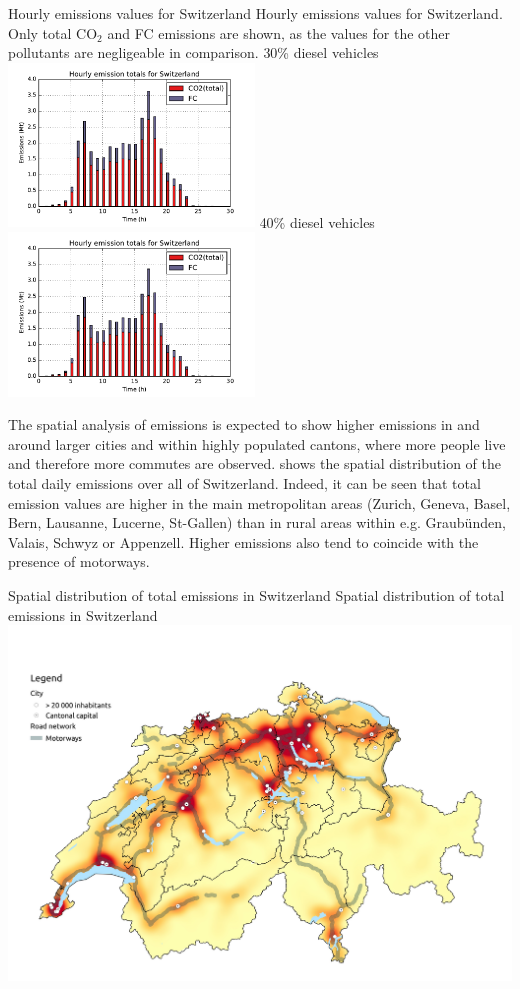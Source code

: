\createfigure%
{Hourly emissions values for Switzerland}%
{Hourly emissions values for Switzerland. Only total CO$_2$ and FC emissions are shown, as the values for the other pollutants are negligeable in comparison.}%
{\label{fig:hourlyEmissions}}%
{%
  \createsubfigure%
  {30\% diesel vehicles}%
  {\includegraphics[width=0.49\textwidth,
angle=0]{figures/hourly_emissions_30pct_diesel.pdf}}%
  {\label{fig:hourlyEmissions-30pctDiesel}}%
  {}%
  \createsubfigure%
  {40\% diesel vehicles}%
  {\includegraphics[width=0.49\textwidth,
angle=0]{figures/hourly_emissions_40pct_diesel.pdf}}%
  {}%
}%
{}

The spatial analysis of emissions is expected to show higher emissions in and around larger cities and within highly populated cantons, where more people live and therefore more commutes are observed.
 shows the spatial distribution of the total daily emissions over all of Switzerland.
Indeed, it can be seen that total emission values are higher in the main metropolitan areas (Zurich, Geneva, Basel, Bern, Lausanne, Lucerne, St-Gallen) than in rural areas within e.g. Graub\"unden, Valais, Schwyz or Appenzell.
Higher emissions also tend to coincide with the presence of motorways.

\createfigure%
{Spatial distribution of total emissions in Switzerland}%
{Spatial distribution of total emissions in Switzerland}%
{\label{fig:spatialEmissions}}%
{\includegraphics[width=1.0\textwidth, angle=0]{figures/total_emissions_heatmap.pdf}}%
{}

